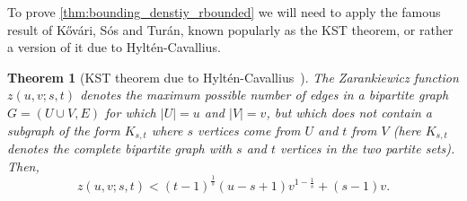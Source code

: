 \documentclass[10pt,a4paper]{article}
\newtheorem{theorem}{Theorem}[section]
\DeclareMathOperator{\1}{\mathbf{1}}
\begin{document}
\denstiyrbounded*

To prove \cref{thm:bounding_denstiy_rbounded} we will need to apply the famous result of K\H{o}v\'{a}ri, S\'{o}s and Tur\'{a}n, known popularly as the KST theorem, or rather a version of it due to Hyltén-Cavallius.

\begin{theorem}[KST theorem due to Hyltén-Cavallius~\cite{HyltenCavallius1958}]
\label{thm:KST}
The Zarankiewicz function $z(u,v;s,t)$ denotes the maximum possible number of edges in a bipartite graph $G=(U\cup V, E)$ for which $|U|=u$ and $|V|=v$, but which does not contain a subgraph of the form $K_{s,t}$ where $s$ vertices come from $U$ and $t$ from $V$ (here $K_{s,t}$ denotes the complete bipartite graph with $s$ and $t$ vertices in the two partite sets).
Then, $$z(u,v;s,t) < (t-1)^{\frac{1}{s}} (u-s+1) v^{1-\frac{1}{s}} + (s-1)v.$$

\end{theorem}
\end{document}
